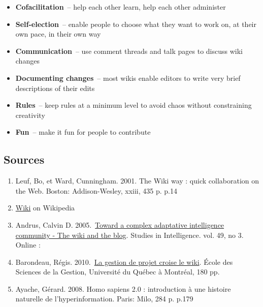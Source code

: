 \begin{itemize}
\item
  \textbf{Cofacilitation}~-- help each other learn, help each other
  administer
\item
  \textbf{Self-election}~-- enable people to choose what they want to
  work on, at their own pace, in their own way
\item
  \textbf{Communication}~-- use comment threads and talk pages to
  discuss wiki changes
\item
  \textbf{Documenting changes}~-- most wikis enable editors to write
  very brief descriptions of their edits
\item
  \textbf{Rules}~-- keep rules at a minimum level to avoid chaos without
  constraining creativity
\item
  \textbf{Fun}~-- make it fun for people to contribute
\end{itemize}

\subsection{Sources}

\begin{enumerate}
\item
  Leuf, Bo, et Ward, Cunningham. 2001. The Wiki way : quick
  collaboration on the Web. Boston: Addison-Wesley, xxiii, 435 p. p.14
\item
  \href{http://en.wikipedia.org/wiki/Wiki}{Wiki} on Wikipedia
\item
  Andrus, Calvin D. 2005.~\href{http://ssrn.com/abstract=755904}{Toward
  a complex adaptative intelligence community - The wiki and the blog}.
  Studies in Intelligence. vol. 49, no 3. Online :
\item
  Barondeau, Régis.
  2010.~\href{http://www.regisbarondeau.com/Chapitre+4\%3A+Analyse+du+cas\#Synth\_se}{La
  gestion de projet croise le wiki}. École des Sciences de la Gestion,
  Université du Québec à Montréal, 180 pp.
\item
  Ayache, Gérard. 2008. Homo sapiens 2.0 : introduction à une histoire
  naturelle de l'hyperinformation. Paris: Milo, 284 p. p.179
\end{enumerate}
